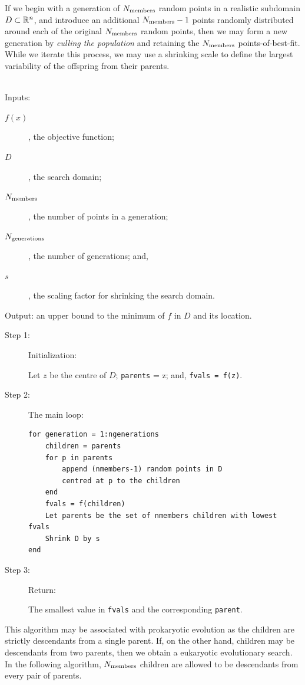 If we begin with a generation of $N_{\rm members}$ random points in a realistic subdomain $D\subset\mathbb{R}^n$, and introduce an additional $N_{\rm members} -1$ points randomly distributed around each of the original $N_{\rm members}$ random points, then we may form a new generation by {\em culling the population} and retaining the $N_{\rm members}$ points-of-best-fit. While we iterate this process, we may use a shrinking scale to define the largest variability of the offspring from their parents.

\begin{algorithm}~\\
Inputs: \begin{description} \item[$f(x)$], the objective function;
\item[$D$], the search domain;
\item[$N_{\rm members}$], the number of points in a generation;
\item[$N_{\rm generations}$], the number of generations; and,
\item[$s$], the scaling factor for shrinking the search domain.
\end{description}
Output: an upper bound to the minimum of $f$ in $D$ and its location.
\begin{description}
\item[Step 1:] Initialization:

Let $z$ be the centre of $D$; {\tt parents} = z; and, {\tt fvals = f(z)}.
\item[Step 2:] The main loop:
\begin{verbatim}
for generation = 1:ngenerations
    children = parents
    for p in parents
        append (nmembers-1) random points in D
        centred at p to the children
    end
    fvals = f(children)
    Let parents be the set of nmembers children with lowest fvals
    Shrink D by s
end    
\end{verbatim}
\item[Step 3:] Return:

The smallest value in {\tt fvals} and the corresponding {\tt parent}.
\end{description}
\end{algorithm}

This algorithm may be associated with prokaryotic evolution as the children are strictly descendants from a single parent. If, on the other hand, children may be descendants from two parents, then we obtain a eukaryotic evolutionary search. In the following algorithm, $N_{\rm members}$ children are allowed to be descendants from every pair of parents.

